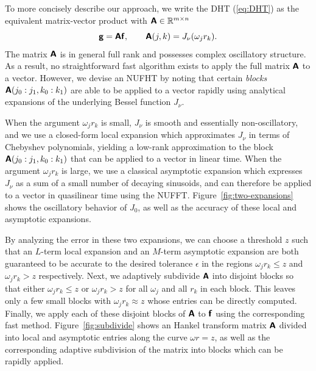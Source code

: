 
To more concisely describe our approach, we write the DHT (\ref{eq:DHT}) as the
equivalent matrix-vector product with $\bm{\mathsf{A}} \in \mathbb{R}^{m \times n}$
\begin{equation}
    \bm{\mathsf{g}} = \bm{\mathsf{A}}\bm{\mathsf{f}}, \qquad \bm{\mathsf{A}}(j,k) = J_\nu(\omega_j r_k).
\end{equation}
The matrix $\bm{\mathsf{A}}$ is in general full rank and possesses complex oscillatory
structure. As a result, no straightforward fast algorithm exists to apply the
full matrix $\bm{\mathsf{A}}$ to a vector. However, we devise an NUFHT by noting that
certain \textit{blocks} $\bm{\mathsf{A}}(j_0:j_1, k_0:k_1)$ are able to be applied to a
vector rapidly using analytical expansions of the underlying Bessel function
$J_\nu$. 

When the argument $\omega_j r_k$ is small, $J_\nu$ is smooth and essentially
non-oscillatory, and we use a closed-form local expansion which approximates
$J_\nu$ in terms of Chebyshev polynomials, yielding a low-rank approximation to
the block $\bm{\mathsf{A}}(j_0:j_1, k_0:k_1)$ that can be applied to a vector in linear
time. When the argument $\omega_j r_k$ is large, we use a classical asymptotic
expansion which expresses $J_\nu$ as a sum of a small number of decaying
sinusoids, and can therefore be applied to a vector in quasilinear time using
the NUFFT. Figure~\ref{fig:two-expansions} shows the oscillatory behavior of
$J_0$, as well as the accuracy of these local and asymptotic expansions.

By analyzing the error in these two expansions, we can choose a threshold $z$
such that an $L$-term local expansion and an $M$-term asymptotic expansion are
both guaranteed to be accurate to the desired tolerance $\epsilon$ in the
regions $\omega_j r_k \leq z$ and $\omega_j r_k > z$ respectively. Next, we
adaptively subdivide $\bm{\mathsf{A}}$ into disjoint blocks so that either $\omega_j r_k
\leq z$ or $\omega_j r_k > z$ for all $\omega_j$ and all $r_k$ in each block.
This leaves only a few small blocks with $\omega_j r_k \approx z$ whose entries
can be directly computed. Finally, we apply each of these disjoint blocks of
$\bm{\mathsf{A}}$ to $\bm{\mathsf{f}}$ using the corresponding fast method.
Figure~\ref{fig:subdivide} shows an Hankel transform matrix $\bm{\mathsf{A}}$ divided
into local and asymptotic entries along the curve $\omega r = z$, as well as the
corresponding adaptive subdivision of the matrix into blocks which can be
rapidly applied.

